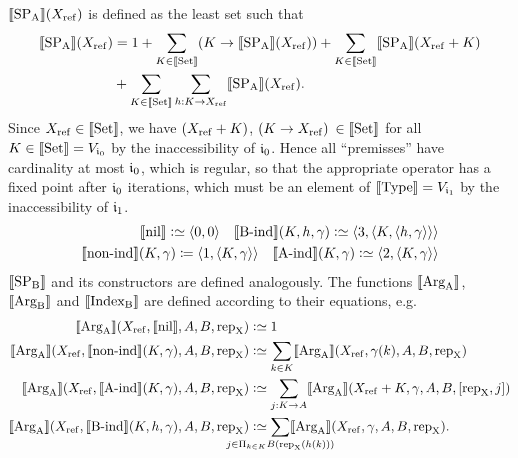 \documentclass{article}
\begin{document}
$\llbracket \text{SP}_{\mathrm{A}} \rrbracket(X_{\mathrm{ref}})$ is defined as the least set such that
\begin{align*}
\llbracket \text{SP}_{\mathrm{A}} \rrbracket(X_{\mathrm{ref}}) &= 1 + \sum_{K \in \llbracket \text{Set} \rrbracket}(K \to \llbracket \text{SP}_{\mathrm{A}} \rrbracket(X_{\mathrm{ref}}))
  + \sum_{K \in \llbracket \text{Set} \rrbracket}\llbracket \text{SP}_{\mathrm{A}} \rrbracket(X_{\mathrm{ref}} + K) \\
 & {} + \sum_{K \in \llbracket \text{Set} \rrbracket}\sum_{h : K \to X_{\mathrm{ref}}}\llbracket \text{SP}_{\mathrm{A}} \rrbracket(X_{\mathrm{ref}}).
\end{align*}
%
Since $X_{\mathrm{ref}} \in \llbracket \text{Set} \rrbracket$, we have $(X_{\mathrm{ref}} + K)$, $(K \to X_{\mathrm{ref}})$
$\in \llbracket \text{Set} \rrbracket$ for all $K \in \llbracket \text{Set} \rrbracket = V_{\mathfrak{i}_0}$ by the
inaccessibility of $\mathfrak{i}_0$. Hence all ``premisses'' have cardinality
at most $\mathfrak{i}_0$, which is regular, so that the appropriate operator
has a fixed point after $\mathfrak{i}_0$ iterations, which must be an element
of $\llbracket \text{Type} \rrbracket = V_{\mathfrak{i}_1}$ by the inaccessibility of $\mathfrak{i}_1$.
%
\begin{align*}
 \llbracket \text{nil} \rrbracket \mathrel{\mathop:}\simeq \langle 0, 0\rangle \quad
 \llbracket \text{B-ind} \rrbracket(K, h, \gamma) \mathrel{\mathop:}\simeq \langle 3 , \langle K, \langle h, \gamma \rangle\rangle\rangle
   \\
  \llbracket \text{non-ind} \rrbracket(K, \gamma) \coloneqq \langle 1 , \langle K, \gamma
  \rangle\rangle \quad \llbracket \text{A-ind} \rrbracket(K, \gamma) \mathrel{\mathop:}\simeq \langle 2 , \langle K, \gamma \rangle\rangle
\end{align*}
$\llbracket \text{SP}_{\mathrm{B}} \rrbracket$ and its constructors are defined analogously. The
functions $\llbracket \text{Arg}_{\mathrm{A}} \rrbracket$, $\llbracket \text{Arg}_{\mathrm{B}} \rrbracket$ and $\llbracket \text{Index}_{\mathrm{B}} \rrbracket$ are defined
according to their equations, e.g.\
\begin{align*}
  \sem{\ArgA}(\Xref, \sem{\nilA}, A, B, \repA) &\colonsimeq 1 \\
\sem{\ArgA}(\Xref, \sem{\nonindA}(K, \gamma), A, B, \repA) &\colonsimeq
  \sum_{k \in K} \sem{\ArgA}(\Xref, \gamma(k), A, B, \repA) \\
\sem{\ArgA}(\Xref, \sem{\AindA}(K, \gamma), A, B, \repA) &\colonsimeq
  \sum_{j : K \to A}\sem{\ArgA}(\Xref + K, \gamma, A, B, [\repA, j]) \\
\sem{\ArgA}(\Xref, \sem{\BindA}(K, h, \gamma), A, B, \repA) &\colonsimeq
  \sum_{\mathclap{j \in \Pi_{k \in K} B(\repA (h(k)))}}\sem{\ArgA}(\Xref, \gamma, A, B, \repA).
\end{align*}
%
%
\end{document}
